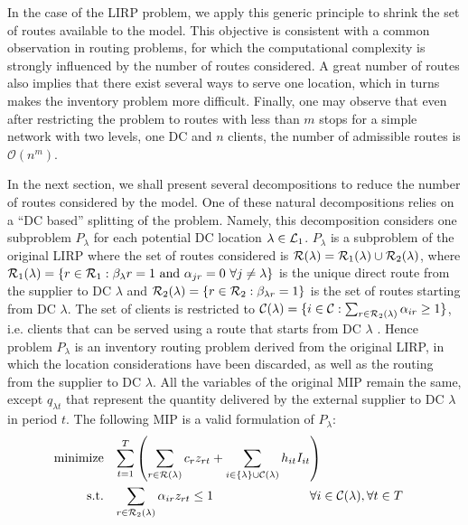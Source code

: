 \documentclass[a4paper,10pt]{article}
\begin{document}
\begin{linenumbers}
In the case of the LIRP problem, we apply this generic principle to shrink the set of routes available to the model. 
This objective is consistent with a common observation in routing problems, for which the computational complexity is strongly influenced by the number of routes considered.
A great number of routes also implies that there exist several ways to serve one location, which in turns makes the inventory problem more difficult.
Finally, one may observe that even after restricting the problem to routes with less than $m$ stops for a simple network with two levels, one DC and $n$ clients, the number of admissible routes is $\mathcal{O}(n^m)$.

In the next section, we shall present several decompositions to reduce the number of routes considered by the model. 
One of these natural decompositions relies on a ``DC based'' splitting of the problem. 
Namely, this decomposition considers one subproblem $P_{\lambda}$ for each potential DC location $\lambda\in \mathcal{L}_1$.
$P_{\lambda}$ is a subproblem of the original LIRP where the set of routes considered is $\mathcal{R}(\lambda)= \mathcal{R}_1(\lambda) \cup \mathcal{R}_2(\lambda)$, where $\mathcal{R}_1(\lambda)=\left\{r\in\mathcal{R}_1:\beta_{\lambda}r=1 \mbox{ and } \alpha_{jr}=0\ \forall j\neq \lambda\right\}$ is the unique direct route from the supplier to DC $\lambda$ and $\mathcal{R}_2(\lambda)=\left\{r\in\mathcal{R}_2: \beta_{\lambda r}=1\right\}$ is the set of routes starting from DC $\lambda$.
The set of clients is restricted to $\mathcal{C}(\lambda) =\{i\in\mathcal{C}: \sum_{r\in\mathcal{R}_2(\lambda)} \alpha_{ir}\geq 1 \}$, i.e. clients that can be served using a route that starts from DC $\lambda$ . 
Hence problem $P_{\lambda}$ is an inventory routing problem derived from the original LIRP, in which the location considerations have been discarded, as well as the routing from the supplier to DC $\lambda$. 
All the variables of the original MIP remain the same, except $q_{\lambda t}$ that represent the quantity delivered by the external supplier to DC $\lambda$ in period $t$.
The following MIP is a valid formulation of $P_{\lambda}$:
\begin{alignat}{3}
    \text{minimize} &&\sum_{t=1}^{T} \left( \sum_{r\in \ro(\lambda)} c_r z_{rt} + \sum_{i\in \left\{\lambda\right\}\cup \cu(\lambda)} h_{it} I_{it}\right)\span\omit\span\label{decomp_objfunct}\\ 
    \text{s.t.}  %
    &&\sum_{r\in \ro_2(\lambda)} \alpha_{ir} z_{rt} &\leq 1 															&\forall i&\in \cu(\lambda), \forall t\in T  \label{const:decomp_singleroutecustomers}\\

\end{alignat}
\end{linenumbers}
\end{document}
